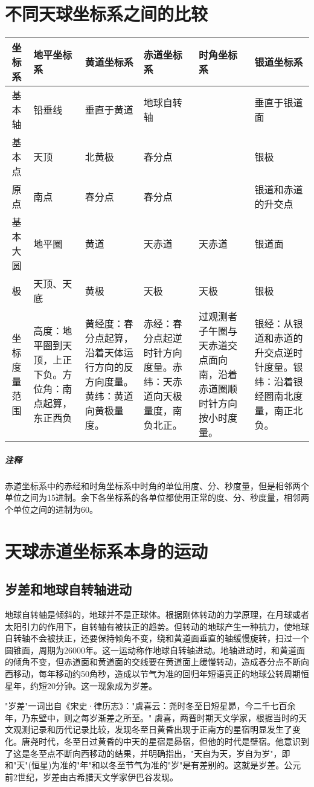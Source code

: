 \section{不同天球坐标系之间的比较}
\begin{center}
	\begin{tabularx}{\textwidth}{|c|X|X|X|X|X|}
	\hline
	坐标系 &地平坐标系&黄道坐标系&赤道坐标系&时角坐标系&银道坐标系\\
	\hline 
	基本轴 &铅垂线&垂直于黄道&地球自转轴&  &垂直于银道面\\
	\hline 
	基本点 &天顶 & 北黄极 & 春分点 &   & 银极 \\
	\hline
	原点 & 南点&春分点&春分点&&银道和赤道的升交点\\
	\hline
	基本大圆&地平圈&黄道&天赤道&天赤道&银道面\\
	\hline 
	极&天顶、天底&黄极&天极&天极&银极\\
	\hline
	坐标度量范围&高度：地平圈到天顶，上正下负。方位角：南点起算，东正西负&黄经度：春分点起算，沿着天体运行方向的反方向度量。黄纬：黄道向黄极量度。&赤经：春分点起逆时针方向度量。赤纬：天赤道向天极量度，南负北正。&过观测者子午圈与天赤道交点面向南，沿着赤道圈顺时针方向按小时度量。&银经：从银道和赤道的升交点逆时针度量。银纬：沿着银经圈南北度量，南正北负。\\
	\hline
	\end{tabularx}
\end{center}
\subparagraph{注释}
赤道坐标系中的赤经和时角坐标系中时角的单位用度、分、秒度量，但是相邻两个单位之间为15进制。余下各坐标系的各单位都使用正常的度、分、秒度量，相邻两个单位之间的进制为60。
\section{天球赤道坐标系本身的运动}
\subsection{岁差和地球自转轴进动}
地球自转轴是倾斜的，地球并不是正球体。根据刚体转动的力学原理，在月球或者太阳引力的作用下，自转轴有被扶正的趋势。但转动的地球产生一种抗力，使地球自转轴不会被扶正，还要保持倾角不变，绕和黄道面垂直的轴缓慢旋转，扫过一个圆锥面，周期为26000年。这一运动称作地球自转轴进动。地轴进动时，和黄道面的倾角不变，但赤道面和黄道面的交线要在黄道面上缓慢转动，造成春分点不断向西移动，每年移动约50角秒，造成以节气为准的回归年短语真正的地球公转周期恒星年，约短20分钟。这一现象成为岁差。

"岁差"一词出自《宋史·律历志》："虞喜云：尧时冬至日短星昴，今二千七百余年，乃东壁中，则之每岁渐差之所至。" 虞喜，两晋时期天文学家，根据当时的天文观测记录和历代记录比较，发现冬至日黄昏出现于正南方的星宿明显发生了变化。唐尧时代，冬至日过黄昏的中天的星宿是昴宿，但他的时代是壁宿。他意识到了这是冬至点不断向西移动的结果，并明确指出，"天自为天，岁自为岁"，即和"天"(恒星)为准的"年"和以冬至节气为准的"岁"是有差别的。这就是岁差。公元前2世纪，岁差由古希腊天文学家伊巴谷发现。
